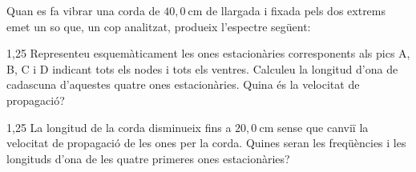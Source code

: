 Quan es fa vibrar una corda de $40,0\ \mathrm{cm}$ de llargada i fixada pels dos extrems emet un so que, un cop analitzat, produeix l'espectre següent:


\begin{apartat}{1,25}
Representeu esquemàticament les ones estacionàries corresponents als pics A, B, C i D indicant tots els nodes i tots els ventres. Calculeu la longitud d'ona de cadascuna d'aquestes quatre ones estacionàries. Quina és la velocitat de propagació?
\end{apartat}

\begin{apartat}{1,25}
La longitud de la corda disminueix fins a $20,0\ \mathrm{cm}$ sense que canviï la velocitat de propagació de les ones per la corda. Quines seran les freqüències i les longituds d'ona de les quatre primeres ones estacionàries?
\end{apartat}
